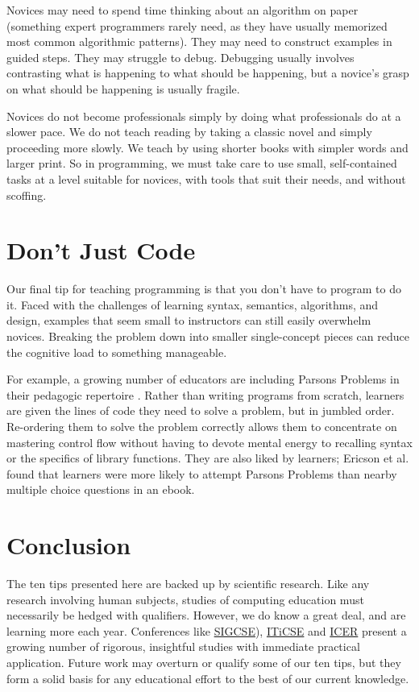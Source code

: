 Novices may need to spend time thinking about an algorithm on paper
(something expert programmers rarely need, as they have usually
memorized most common algorithmic patterns).  They may need to
construct examples in guided steps.  They may struggle to debug.
Debugging usually involves contrasting what is happening to what
should be happening, but a novice's grasp on what should be happening
is usually fragile.

Novices do not become professionals simply by doing what professionals
do at a slower pace.  We do not teach reading by taking a classic
novel and simply proceeding more slowly.  We teach by using shorter
books with simpler words and larger print.  So in programming, we must
take care to use small, self-contained tasks at a level suitable for
novices, with tools that suit their needs, and without scoffing.

\section*{Don't Just Code}

Our final tip for teaching programming is that you don't have to
program to do it.  Faced with the challenges of learning syntax,
semantics, algorithms, and design, examples that seem small to
instructors can still easily overwhelm novices.  Breaking the problem
down into smaller single-concept pieces can reduce the cognitive load
to something manageable.

For example, a growing number of educators are including Parsons
Problems in their pedagogic repertoire
\cite{Pars2006,Morr2016}.  Rather than writing programs from
scratch, learners are given the lines of code they need to solve a
problem, but in jumbled order.  Re-ordering them to solve the problem
correctly allows them to concentrate on mastering control flow without
having to devote mental energy to recalling syntax or the specifics of
library functions.  They are also liked by learners; Ericson et
al. \cite{Eric2015} found that learners were more likely to attempt
Parsons Problems than nearby multiple choice questions in an ebook.

\section*{Conclusion}

The ten tips presented here are backed up by scientific research.
Like any research involving human subjects, studies of computing
education must necessarily be hedged with qualifiers.  However, we do
know a great deal, and are learning more each year.  Conferences like
\href{http://sigcse.org/}{SIGCSE}),
\href{http://iticse.acm.org/}{ITiCSE} and
\href{https://icer.hosting.acm.org}{ICER} present a growing number of
rigorous, insightful studies with immediate practical application.
Future work may overturn or qualify some of our ten tips, but they
form a solid basis for any educational effort to the best of our
current knowledge.

